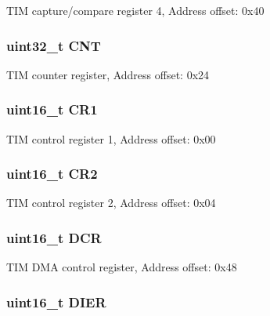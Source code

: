 T\-I\-M capture/compare register 4, Address offset\-: 0x40 \hypertarget{struct_t_i_m___type_def_a6095a27d764d06750fc0d642e08f8b2a}{
\subsubsection[{C\-N\-T}]{ uint32\-\_\-t C\-N\-T}}\label{struct_t_i_m___type_def_a6095a27d764d06750fc0d642e08f8b2a}
T\-I\-M counter register, Address offset\-: 0x24 \hypertarget{struct_t_i_m___type_def_a61400ce239355b62aa25c95fcc18a5e1}{
\subsubsection[{C\-R1}]{ uint16\-\_\-t C\-R1}}\label{struct_t_i_m___type_def_a61400ce239355b62aa25c95fcc18a5e1}
T\-I\-M control register 1, Address offset\-: 0x00 \hypertarget{struct_t_i_m___type_def_a2a3e81bd118d1bc52d24a0b0772e6a0c}{
\subsubsection[{C\-R2}]{ uint16\-\_\-t C\-R2}}\label{struct_t_i_m___type_def_a2a3e81bd118d1bc52d24a0b0772e6a0c}
T\-I\-M control register 2, Address offset\-: 0x04 \hypertarget{struct_t_i_m___type_def_a0afd527a4ec64faf878f9957096102bf}{
\subsubsection[{D\-C\-R}]{ uint16\-\_\-t D\-C\-R}}\label{struct_t_i_m___type_def_a0afd527a4ec64faf878f9957096102bf}
T\-I\-M D\-M\-A control register, Address offset\-: 0x48 \hypertarget{struct_t_i_m___type_def_a1481b34cc41018c17e4ab592a1c8cb55}{
\subsubsection[{D\-I\-E\-R}]{ uint16\-\_\-t D\-I\-E\-R}}\label{struct_t_i_m___type_def_a1481b34cc41018c17e4ab592a1c8cb55}
